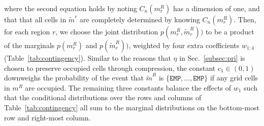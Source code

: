 where the second equation holds by noting $C_{n}(m^{R}_{r})$ has a dimension of one, and that that all cells in $\tilde{m}^{r}$ are completely determined by knowing $C_{n}(m^{R}_{r})$. Then, for each region $r$, we choose the joint distribution $p(m^{R}_{r},\tilde{m}^{R}_{r}))$ to be a product of the marginals $p(m^{R}_{r})$ and $p(\tilde{m}^R_{r}))$, weighted by four extra coefficients $w_{1:4}$ (Table~\ref{tab:contingency}). Similar to the reasons that $\eta$ in Sec.~\ref{subsec:pri} is chosen to preserve occupied cells through compression, the constant $c_1 \in (0, 1)$ downweighs the probability of the event that $\tilde{m}^{R}$ is $\{\texttt{EMP},\dots,\texttt{EMP}\}$ if any grid cells in $m^{R}$ are occupied. The remaining three constants balance the effects of $w_{1}$ such that the conditional distributions over the rows and columns of Table~\ref{tab:contingency} all sum to the marginal distributions on the bottom-most row and right-most column.






